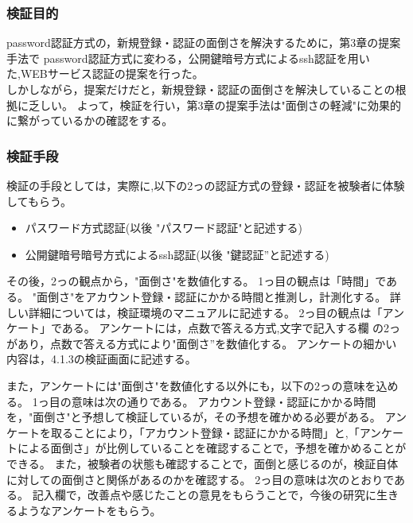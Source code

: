     \subsubsection{検証目的}
    password認証方式の，新規登録・認証の面倒さを解決するために，第3章の提案手法で
    password認証方式に変わる，公開鍵暗号方式によるssh認証を用いた,WEBサービス認証の提案を行った。\\
    しかしながら，提案だけだと，新規登録・認証の面倒さを解決していることの根拠に乏しい。
    よって，検証を行い，第3章の提案手法は"面倒さの軽減"に効果的に繋がっているかの確認をする。
    \subsubsection{検証手段} 
    検証の手段としては，実際に,以下の2っの認証方式の登録・認証を被験者に体験してもらう。

    \begin{itemize}
    \item パスワード方式認証(以後 "パスワード認証"と記述する)
    \item 公開鍵暗号暗号方式によるssh認証(以後 "鍵認証”と記述する)
    \end{itemize}

    その後，2っの観点から，"面倒さ"を数値化する。
    1っ目の観点は「時間」である。
    "面倒さ"をアカウント登録・認証にかかる時間と推測し，計測化する。
    詳しい詳細については，検証環境のマニュアルに記述する。
    2っ目の観点は「アンケート」である。
    アンケートには，点数で答える方式,文字で記入する欄 の2っがあり，点数で答える方式により"面倒さ”を数値化する。
    アンケートの細かい内容は，4.1.3の検証画面に記述する。

    また，アンケートには"面倒さ"を数値化する以外にも，以下の2っの意味を込める。
    1っ目の意味は次の通りである。
    アカウント登録・認証にかかる時間 を，"面倒さ"と予想して検証しているが，その予想を確かめる必要がある。
    アンケートを取ることにより，「アカウント登録・認証にかかる時間」と,「アンケートによる面倒さ」が比例していることを確認することで，予想を確かめることができる。
    また，被験者の状態も確認することで，面倒と感じるのが，検証自体に対しての面倒さと関係があるのかを確認する。
    2っ目の意味は次のとおりである。
    記入欄で，改善点や感じたことの意見をもらうことで，今後の研究に生きるようなアンケートをもらう。


